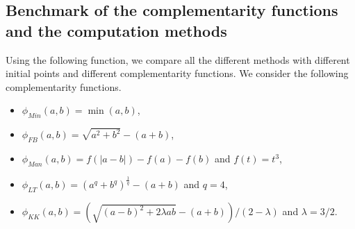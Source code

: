 \documentclass[11pt]{article}
\begin{document}
\subsection{Benchmark of the complementarity functions and the computation methods}
Using the following function, we compare all the different methods with different initial points and different complementarity functions.
We consider the following complementarity functions.
\begin{itemize}
\item $\phi_{Min}(a,b)=\min(a,b)$,
\item $\phi_{FB}(a,b)=\sqrt{a^2+b^2} -(a+b)$,
\item $\phi_{Man}(a,b)=f(|a-b|) - f(a) - f(b)$ and $f(t)=t^3$,
\item $\phi_{LT}(a,b)=(a^q+b^q)^{\frac{1}{q}} -(a+b)$ and $q=4$,
\item $\phi_{KK}(a,b)= (\sqrt{(a-b)^2+2\lambda a b} -(a+b))/(2-\lambda)$ and $\lambda=3/2$.
\end{itemize}
%
%
%
%
%
%
%
\end{document}
